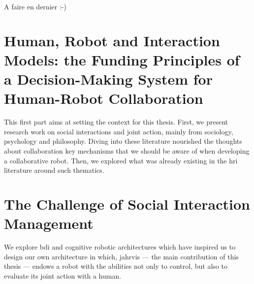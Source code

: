 \documentclass[english,a4paper,11pt,twoside]{StyleThese}
\begin{document}
A faire en dernier :-) 

\tableofcontents

\printnoidxglossary[type=\acronymtype]
%



\mainmatter
{}

\fancyhead[RE]{\bfseries\nouppercase{\leftmark}}      %
\fancyhead[LO]{\bfseries\nouppercase{\rightmark}}     %

\part{Human, Robot and Interaction Models: the Funding Principles of a Decision-Making System for Human-Robot Collaboration}\label{part:part1}
\begin{partintro}
	This first part aims at setting the context for this thesis. First, we present research work on social interactions and joint action, mainly from sociology, psychology and philosophy. Diving into these literature nourished the thoughts about collaboration key mechanisms that we should be aware of when developing a collaborative robot. Then, we explored what was already existing in the \acrlong{hri} literature around such thematics.
\end{partintro}


\part{The Challenge of Social Interaction Management}\label{part:part2}
\begin{partintro}
	We explore \acrfull{bdi} and cognitive robotic architectures  which have inspired us to design our own architecture in which, \acrshort{jahrvis} —  the main contribution of this thesis — endows a robot with the abilities not only to control, but also to evaluate its joint action with a human.
\end{partintro}	


\end{document}
